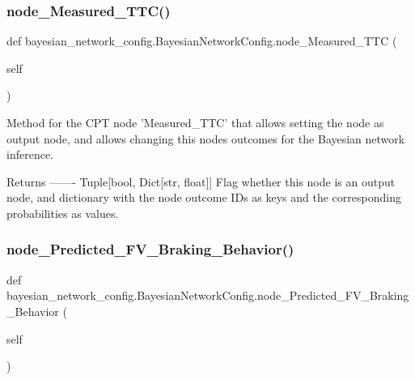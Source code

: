 \subsubsection{\texorpdfstring{node\+\_\+\+Measured\+\_\+\+T\+T\+C()}{node\_Measured\_TTC()}}
{\footnotesize\ttfamily def bayesian\+\_\+network\+\_\+config.\+Bayesian\+Network\+Config.\+node\+\_\+\+Measured\+\_\+\+T\+TC (\begin{DoxyParamCaption}\item[{}]{self }\end{DoxyParamCaption})}

\begin{DoxyVerb}Method for the CPT node 'Measured_TTC' that allows setting the node as output node,
and allows changing this nodes outcomes for the Bayesian network inference.

Returns
-------
Tuple[bool, Dict[str, float]]
    Flag whether this node is an output node, and dictionary with the node outcome IDs as keys
    and the corresponding probabilities as values.
\end{DoxyVerb}
 \mbox{\label{classbayesian__network__config_1_1_bayesian_network_config_a2f2e6cb9c1179565953917ff4f56935c}} 
\subsubsection{\texorpdfstring{node\+\_\+\+Predicted\+\_\+\+F\+V\+\_\+\+Braking\+\_\+\+Behavior()}{node\_Predicted\_FV\_Braking\_Behavior()}}
{\footnotesize\ttfamily def bayesian\+\_\+network\+\_\+config.\+Bayesian\+Network\+Config.\+node\+\_\+\+Predicted\+\_\+\+F\+V\+\_\+\+Braking\+\_\+\+Behavior (\begin{DoxyParamCaption}\item[{}]{self }\end{DoxyParamCaption})}

